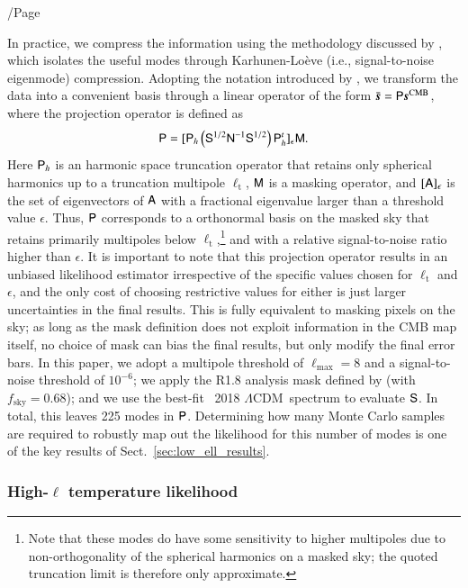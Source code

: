 /Page\documentclass[twocolumn]{aa}
\def\LCDM{$\Lambda$CDM}
\newcommand{\A}[0]{\tens{A}}
\newcommand{\s}[0]{\vec{s}}
\newcommand{\N}[0]{\tens{N}}
\newcommand{\M}[0]{\tens{M}}
\renewcommand{\S}[0]{\tens{S}}
\renewcommand{\P}[0]{\tens{P}}
\begin{document}
In practice, we compress the information using the methodology
discussed by \citet{tegmark1997}, which isolates the useful modes
through Karhunen-Lo\`eve (i.e., signal-to-noise eigenmode)
compression. Adopting the notation introduced by \citet{gjerlow2015},
we transform the data into a convenient basis through a linear
operator of the form $\bar{\s}=\P\s^{\mathrm{CMB}}$, where the
projection operator is defined as
\begin{equation}
  \label{eq:s2n_operator}
  \P = \lbrack\P_h\left( \S^{1/2}\N^{-1}\S^{1/2} \right)\P_h^t\rbrack_\epsilon\M.
\end{equation}
Here $\P_h$ is an harmonic space truncation operator that retains only
spherical harmonics up to a truncation multipole $\ell_\mathrm{t}$,
$\M$ is a masking operator, and $\lbrack\A\rbrack_\epsilon$ is the set
of eigenvectors of $\A$ with a fractional eigenvalue larger than a
threshold value $\epsilon$. Thus, $\P$ corresponds to a orthonormal
basis on the masked sky that retains primarily multipoles below
$\ell_\mathrm{t}$,\footnote{Note that these modes do have some sensitivity to higher multipoles due to non-orthogonality of the spherical harmonics on a masked sky; the quoted truncation limit is therefore only approximate.} and with a relative
signal-to-noise ratio higher than $\epsilon$. It is important to note
that this projection operator results in an unbiased likelihood
estimator irrespective of the specific values chosen for
$\ell_\mathrm{t}$ and $\epsilon$, and the only cost of choosing
restrictive values for either is just larger uncertainties in the
final results. This is fully equivalent to masking pixels on the sky;
as long as the mask definition does not exploit information in the CMB
map itself, no choice of mask can bias the final results, but only
modify the final error bars. In this paper, we adopt a multipole
threshold of $ \ell_{\mathrm{max}}=8$ and a signal-to-noise threshold
of $10^{-6}$; we apply the R1.8 analysis mask defined by
\citet{planck2016-l05} (with $f_{\mathrm{sky}}=0.68$); and we use the
best-fit \Planck\ 2018 \LCDM\ spectrum to evaluate $\S$. In total,
this leaves 225 modes in $\P$. Determining how many Monte Carlo
samples are required to robustly map out the likelihood for this
number of modes is one of the key results of
Sect.~\ref{sec:low_ell_results}.

\subsubsection{High-$\ell$ temperature likelihood}
\end{document}
